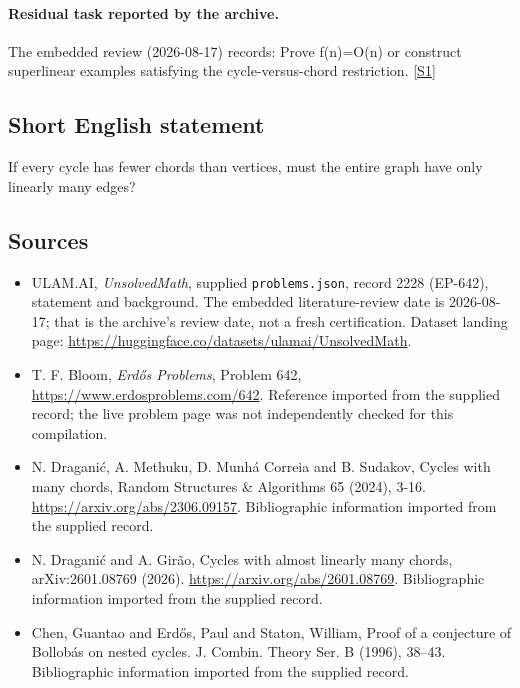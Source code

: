 \documentclass[11pt,a4paper]{article}
\newcommand{\sref}[2]{\hyperlink{source:#1:#2}{[S#2]}}
\begin{document}
\paragraph{Residual task reported by the archive.}

The embedded review (2026-08-17) records: Prove f(n)=O(n) or construct superlinear examples satisfying the cycle-versus-chord restriction. \sref{2228}{1}

\subsection{Short English statement}

If every cycle has fewer chords than vertices, must the entire graph have only linearly many edges?

\subsection{Sources}

{\small

\begin{itemize}

\item[\hypertarget{source:2228:1}{S1}] ULAM.AI, \emph{UnsolvedMath}, supplied \texttt{problems.json}, record 2228 (EP-642), statement and background. The embedded literature-review date is 2026-08-17; that is the archive’s review date, not a fresh certification. Dataset landing page: \url{https://huggingface.co/datasets/ulamai/UnsolvedMath}.

\item[\hypertarget{source:2228:2}{S2}] T. F. Bloom, \emph{Erdős Problems}, Problem 642, \url{https://www.erdosproblems.com/642}. Reference imported from the supplied record; the live problem page was not independently checked for this compilation.

\item[\hypertarget{source:2228:3}{S3}] N. Draganić, A. Methuku, D. Munhá Correia and B. Sudakov, Cycles with many chords, Random Structures \& Algorithms 65 (2024), 3-16. \url{https://arxiv.org/abs/2306.09157}. Bibliographic information imported from the supplied record.

\item[\hypertarget{source:2228:4}{S4}] N. Draganić and A. Girão, Cycles with almost linearly many chords, arXiv:2601.08769 (2026). \url{https://arxiv.org/abs/2601.08769}. Bibliographic information imported from the supplied record.

\item[\hypertarget{source:2228:5}{S5}] Chen, Guantao and Erd\H{o}s, Paul and Staton, William, Proof of a conjecture of {B}ollob\'as on nested cycles. J. Combin. Theory Ser. B (1996), 38--43. Bibliographic information imported from the supplied record.

\end{itemize}

}

\label{end:2228}
\end{document}
